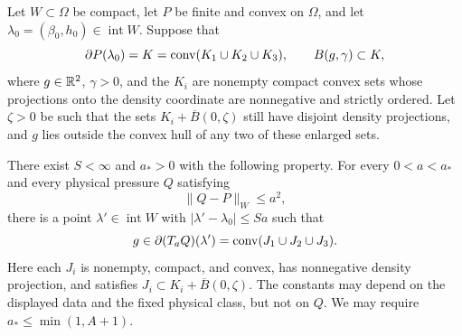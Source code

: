 \begin{lemma}
\label{lem:persistence}
Let $W\subset\Omega$ be compact, let $P$ be finite and convex on $\Omega$,
and let $\lambda_0=(\beta_0,h_0)\in\operatorname{int}W$. Suppose that
\begin{equation}
 \partial P(\lambda_0)=K=\operatorname{conv}(K_1\cup K_2\cup K_3),
 \qquad B(g,\gamma)\subset K,
 \label{eq:persistence-input}
\end{equation}
where $g\in\mathbb R^2$, $\gamma>0$, and the $K_i$ are nonempty compact convex
sets whose projections onto the density coordinate are nonnegative and
strictly ordered. Let $\zeta>0$ be such that the sets
$K_i+\overline B(0,\zeta)$ still have disjoint density projections, and
$g$ lies outside the convex hull of any two of these enlarged sets.

There exist $S<\infty$ and $a_*>0$ with the following property. For every
$0<a<a_*$ and every physical pressure $Q$ satisfying
\begin{equation}
 \|Q-P\|_W\leq a^2,
 \label{eq:persistence-error}
\end{equation}
there is a point $\lambda'\in\operatorname{int}W$ with
$|\lambda'-\lambda_0|\leq Sa$ such that
\begin{equation}
 g\in\partial(T_aQ)(\lambda')
   =\operatorname{conv}(J_1\cup J_2\cup J_3).
 \label{eq:persistence-output}
\end{equation}
Here each $J_i$ is nonempty, compact, and convex, has nonnegative density
projection, and satisfies $J_i\subset K_i+\overline B(0,\zeta)$.
The constants may depend on the displayed data and the fixed physical
class, but not on $Q$. We may require $a_*\leq\min(1,A+1)$.
\end{lemma}


